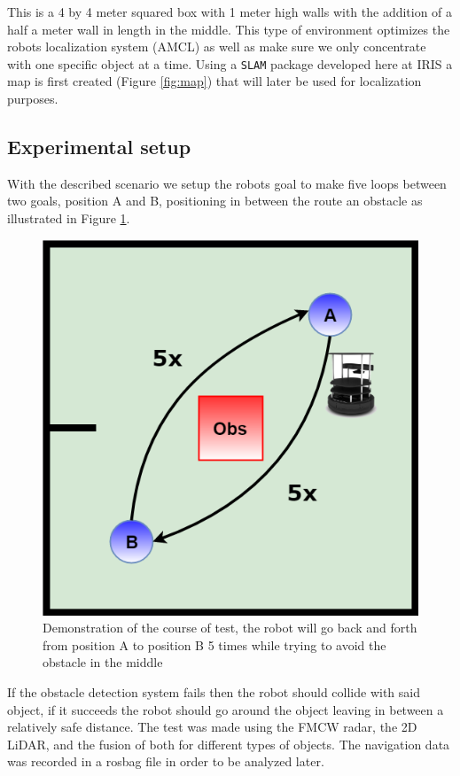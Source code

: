 This is a 4 by 4 meter squared box with 1 meter high walls with the addition of a half a meter wall in length in the middle. This type of environment optimizes the robots localization system (\ac{AMCL}) as well as make sure we only concentrate with one specific object at a time. Using a \texttt{\ac{SLAM}} package developed here at \ac{IRIS} a map is first created (Figure \ref{fig:map}) that will later be used for localization purposes.

\subsection{Experimental setup}
With the described scenario we setup the robots goal to make five loops between two goals, position A and B, positioning in between the route an obstacle as illustrated in  Figure \ref{fig:exp}. 
\begin{figure}[ht!]
\centerline{\includegraphics [width=0.5 \textwidth]{imgs/chapter5/exp.png}}
\caption{Demonstration of the course of test, the robot will go back and forth from position A to position B 5 times while  trying to avoid the obstacle in the middle}
\label{fig:exp}
\end{figure}

If the obstacle detection system fails then the robot should collide with said object, if it succeeds the robot should go around the object leaving in between a relatively safe distance. The test was made using the \ac{FMCW} radar, the 2D \ac{LiDAR}, and the fusion of both for different types of objects. The  navigation data was recorded in a rosbag file in order to be analyzed later.

